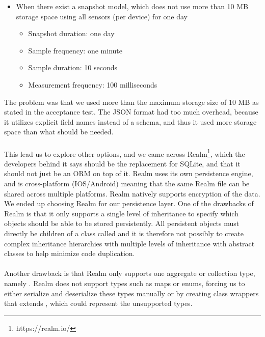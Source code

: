 \begin{itemize}[noitemsep]
 	\item When there exist a snapshot model, which does not use more than 10 MB storage space using all sensors (per device) for one day
	\begin{itemize}[noitemsep,topsep=0pt,parsep=0pt,partopsep=0pt]
		\item Snapshot duration: one day
		\item Sample frequency: one minute
		\item Sample duration: 10 seconds
		\item Measurement frequency: 100 milliseconds
	\end{itemize}
\end{itemize}

The problem was that we used more than the maximum storage size of 10 MB as stated in the acceptance test. The JSON format had too much overhead, because it utilizes explicit field names instead of a schema, and thus it used more storage space than what should be needed. 
\\\\
This lead us to explore other options, and we came across Realm\footnote{https://realm.io/}, which the developers behind it says should be the replacement for SQLite, and that it should not just be an ORM on top of it. Realm uses its own persistence engine, and is cross-platform (IOS/Android) meaning that the same Realm file can be shared across multiple platforms. Realm natively supports encryption of the data. We ended up choosing Realm for our persistence layer. One of the drawbacks of Realm is that it only supports a single level of inheritance to specify which objects should be able to be stored persistently. All persistent objects must directly be children of a class called  and it is therefore not possibly to create complex inheritance hierarchies with multiple levels of inheritance with abstract classes to help minimize code duplication.  
\\\\
Another drawback is that Realm only supports one aggregate or collection type, namely . Realm does not support types such as maps or enums, forcing us to either serialize and deserialize these types manually or by creating class wrappers that extends , which could represent the unsupported types.



